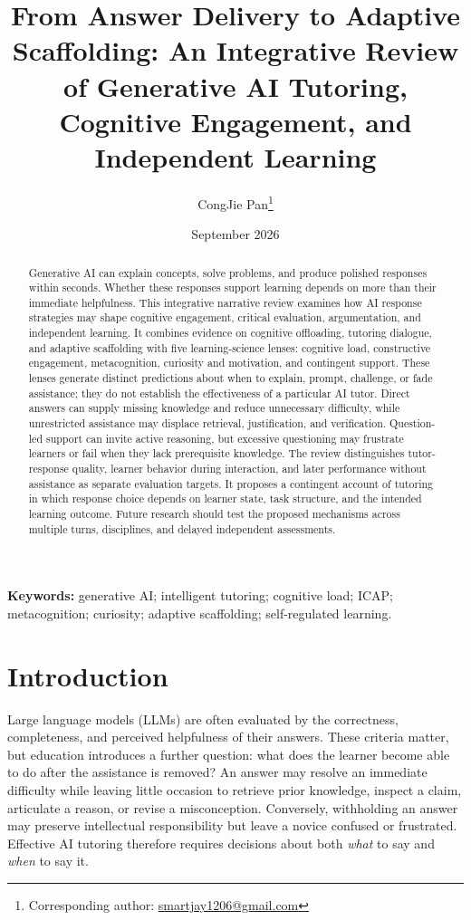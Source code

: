 \documentclass[11pt,a4paper]{article}
\title{From Answer Delivery to Adaptive Scaffolding: An Integrative Review of Generative AI Tutoring, Cognitive Engagement, and Independent Learning}
\author{CongJie Pan\thanks{Corresponding author: \href{mailto:smartjay1206@gmail.com}{smartjay1206@gmail.com}}}
\date{September 2026}
\begin{document}
\maketitle

\begin{abstract}
Generative AI can explain concepts, solve problems, and produce polished responses within seconds. Whether these responses support learning depends on more than their immediate helpfulness. This integrative narrative review examines how AI response strategies may shape cognitive engagement, critical evaluation, argumentation, and independent learning. It combines evidence on cognitive offloading, tutoring dialogue, and adaptive scaffolding with five learning-science lenses: cognitive load, constructive engagement, metacognition, curiosity and motivation, and contingent support. These lenses generate distinct predictions about when to explain, prompt, challenge, or fade assistance; they do not establish the effectiveness of a particular AI tutor. Direct answers can supply missing knowledge and reduce unnecessary difficulty, while unrestricted assistance may displace retrieval, justification, and verification. Question-led support can invite active reasoning, but excessive questioning may frustrate learners or fail when they lack prerequisite knowledge. The review distinguishes tutor-response quality, learner behavior during interaction, and later performance without assistance as separate evaluation targets. It proposes a contingent account of tutoring in which response choice depends on learner state, task structure, and the intended learning outcome. Future research should test the proposed mechanisms across multiple turns, disciplines, and delayed independent assessments.
\end{abstract}

\noindent\textbf{Keywords:} generative AI; intelligent tutoring; cognitive load; ICAP; metacognition; curiosity; adaptive scaffolding; self-regulated learning.

\section{Introduction}
Large language models (LLMs) are often evaluated by the correctness, completeness, and perceived helpfulness of their answers. These criteria matter, but education introduces a further question: what does the learner become able to do after the assistance is removed? An answer may resolve an immediate difficulty while leaving little occasion to retrieve prior knowledge, inspect a claim, articulate a reason, or revise a misconception. Conversely, withholding an answer may preserve intellectual responsibility but leave a novice confused or frustrated. Effective AI tutoring therefore requires decisions about both \emph{what} to say and \emph{when} to say it.
\end{document}
